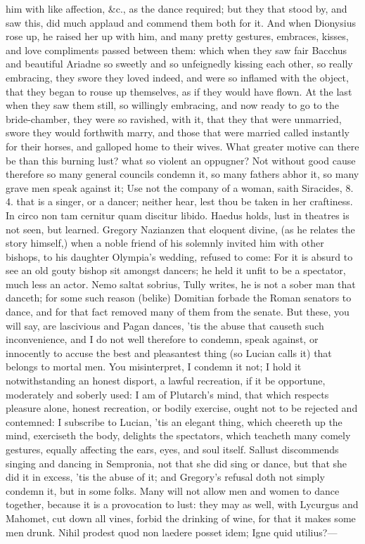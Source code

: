 {him with like affection, \&c., as the dance required; but they that
stood by, and saw this, did much applaud and commend them both for it.
And when Dionysius rose up, he raised her up with him, and many pretty
gestures, embraces, kisses, and love compliments passed between them:
which when they saw fair Bacchus and beautiful Ariadne so sweetly and
so unfeignedly kissing each other, so really embracing, they swore they
loved indeed, and were so inflamed with the object, that they began to
rouse up themselves, as if they would have flown. At the last when they
saw them still, so willingly embracing, and now ready to go to the
bride-chamber, they were so ravished, with it, that they that were
unmarried, swore they would forthwith marry, and those that were
married called instantly for their horses, and galloped home to their
wives. What greater motive can there be than this burning lust? what so
violent an oppugner? Not without good cause therefore so many general
councils condemn it, so many fathers abhor it, so many grave men speak
against it; Use not the company of a woman, saith Siracides, 8. 4. that
is a singer, or a dancer; neither hear, lest thou be taken in her
craftiness. In circo non tam cernitur quam discitur libido.
Haedus holds, lust in theatres is not seen, but learned. Gregory
Nazianzen that eloquent divine, (as he relates the story
himself,) when a noble friend of his solemnly invited him with other
bishops, to his daughter Olympia's wedding, refused to come: For
it is absurd to see an old gouty bishop sit amongst dancers; he held it
unfit to be a spectator, much less an actor. Nemo saltat sobrius, Tully
writes, he is not a sober man that danceth; for some such reason
(belike) Domitian forbade the Roman senators to dance, and for that
fact removed many of them from the senate. But these, you will say, are
lascivious and Pagan dances, 'tis the abuse that causeth such
inconvenience, and I do not well therefore to condemn, speak against,
or innocently to accuse the best and pleasantest thing (so Lucian
calls it) that belongs to mortal men. You misinterpret, I condemn it
not; I hold it notwithstanding an honest disport, a lawful recreation,
if it be opportune, moderately and soberly used: I am of Plutarch's
mind, that which respects pleasure alone, honest recreation, or
bodily exercise, ought not to be rejected and contemned: I subscribe to
Lucian, 'tis an elegant thing, which cheereth up the mind,
exerciseth the body, delights the spectators, which teacheth many
comely gestures, equally affecting the ears, eyes, and soul itself.
Sallust discommends singing and dancing in Sempronia, not that she did
sing or dance, but that she did it in excess, 'tis the abuse of it; and
Gregory's refusal doth not simply condemn it, but in some folks. Many
will not allow men and women to dance together, because it is a
provocation to lust: they may as well, with Lycurgus and Mahomet, cut
down all vines, forbid the drinking of wine, for that it makes some men
drunk.
Nihil prodest quod non laedere posset idem;
Igne quid utilius?---

}
